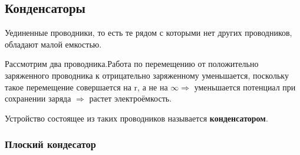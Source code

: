 \documentclass[../main.tex]{subfiles}
\begin{document}
\subsection{Конденсаторы}
Уединенные проводники, то есть те рядом с которыми нет других проводников, обладают малой емкостью.

Рассмотрим два проводника.Работа по перемещению от положительно заряженного проводника к отрицательно заряженному уменьшается, поскольку
такое перемещение совершается на r, а не на $\infty \Rightarrow$ уменьшается потенциал при сохранении заряда $\Rightarrow$
растет электроёмкость.

 Устройство состоящее из таких проводников называется \textbf{конденсатором}.



\subsubsection{Плоский кондесатор}
\end{document}
